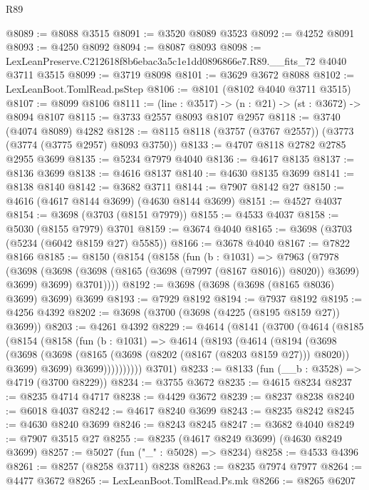 \begin{lexlean}{R89}
\begin{coremodule}
@8089 := @8088 @3515
@8091 := @3520 @8089 @3523
@8092 := @4252 @8091
@8093 := @4250 @8092
@8094 := @8087 @8093
@8098 := LexLeanPreserve.C212618f8b6ebac3a5c1e1dd0896866e7.R89.__fits_72 @4040 @3711 @3515
@8099 := @3719 @8098
@8101 := @3629 @3672 @8088
@8102 := LexLeanBoot.TomlRead.psStep
@8106 := @8101 (@8102 @4040 @3711 @3515)
@8107 := @8099 @8106
@8111 := (line : @3517) -> (n : @21) -> (st : @3672) -> @8094 @8107
@8115 := @3733 @2557 @8093 @8107 @2957
@8118 := @3740 (@4074 @8089) @4282
@8128 := @8115 @8118 (@3757 (@3767 @2557)) (@3773 (@3774 (@3775 @2957) @8093 @3750))
@8133 := @4707 @8118 @2782 @2785 @2955 @3699
@8135 := @5234 @7979 @4040
@8136 := @4617 @8135
@8137 := @8136 @3699
@8138 := @4616 @8137
@8140 := @4630 @8135 @3699
@8141 := @8138 @8140
@8142 := @3682 @3711
@8144 := @7907 @8142 @27
@8150 := @4616 (@4617 @8144 @3699) (@4630 @8144 @3699)
@8151 := @4527 @4037
@8154 := @3698 (@3703 (@8151 @7979))
@8155 := @4533 @4037
@8158 := @5030 (@8155 @7979) @3701
@8159 := @3674 @4040
@8165 := @3698 (@3703 (@5234 (@6042 @8159 @27) @5585))
@8166 := @3678 @4040
@8167 := @7822 @8166
@8185 := @8150
    (@8154
      (@8158
        (fun (b : @1031) =>
        @7963
          (@7978
            (@3698 (@3698 (@3698 (@8165 (@3698 (@7997 (@8167 @8016)) @8020)) @3699) @3699) @3699)
            @3701))))
@8192 := @3698 (@3698 (@3698 (@8165 @8036) @3699) @3699) @3699
@8193 := @7929 @8192
@8194 := @7937 @8192
@8195 := @4256 @4392
@8202 := @3698 (@3700 (@3698 (@4225 (@8195 @8159 @27)) @3699))
@8203 := @4261 @4392
@8229 := @4614
    (@8141
      (@3700
        (@4614
          (@8185
            (@8154
              (@8158
                (fun (b : @1031) =>
                @4614
                  (@8193
                    (@4614
                      (@8194
                        (@3698
                          (@3698
                            (@3698 (@8165 (@3698 (@8202 (@8167 (@8203 @8159 @27))) @8020)) @3699)
                            @3699)
                          @3699))))))))))
      @3701)
@8233 := @8133 (fun (__b : @3528) => @4719 (@3700 @8229))
@8234 := @3755 @3672
@8235 := @4615 @8234
@8237 := @8235 @4714 @4717
@8238 := @4429 @3672
@8239 := @8237 @8238
@8240 := @6018 @4037
@8242 := @4617 @8240 @3699
@8243 := @8235 @8242
@8245 := @4630 @8240 @3699
@8246 := @8243 @8245
@8247 := @3682 @4040
@8249 := @7907 @3515 @27
@8255 := @8235 (@4617 @8249 @3699) (@4630 @8249 @3699)
@8257 := @5027 (fun ("_" : @5028) => @8234)
@8258 := @4533 @4396
@8261 := @8257 (@8258 @3711) @8238
@8263 := @8235 @7974 @7977
@8264 := @4477 @3672
@8265 := LexLeanBoot.TomlRead.Ps.mk
@8266 := @8265 @6207

\end{coremodule}
\end{lexlean}
